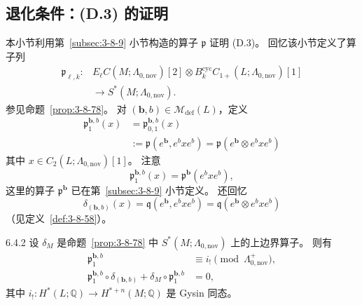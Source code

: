 
\subsection{退化条件：\textup{(D.3)} 的证明}
\label{subsec:6-4-2}

本小节利用第~\ref{subsec:3-8-9} 小节构造的算子
$\mathfrak p$ 证明 \textup{(D.3)}。
回忆该小节定义了算子列
\[
\begin{aligned}
\mathfrak p_{\ell,k}\colon{}&
E_\ell C(M;\Lambda_{0,\mathrm{nov}})[2]
\otimes
B_k^{\mathrm{cyc}}C_{1+}(L;\Lambda_{0,\mathrm{nov}})[1]\\
&\longrightarrow S^*(M;\Lambda_{0,\mathrm{nov}}).
\end{aligned}
\]
参见命题~\ref{prop:3-8-78}。
对 $(\boldsymbol b,b)\in\mathcal M_{\mathrm{def}}(L)$，定义
\begin{equation}
\begin{aligned}
\mathfrak p_1^{\boldsymbol b,b}(x)
&=\mathfrak p_{0,1}^{\boldsymbol b,b}(x)\\
&:=\mathfrak p(e^{\boldsymbol b},e^bxe^b)
=\mathfrak p(e^{\boldsymbol b}\otimes e^bxe^b)
\end{aligned}
\tag{6.4.1}\label{eq:6-4-1}
\end{equation}
其中 $x\in C_2(L;\Lambda_{0,\mathrm{nov}})[1]$。
注意
\[
\mathfrak p_1^{\boldsymbol b,b}(x)
=\mathfrak p^{\boldsymbol b}(e^bxe^b),
\]
这里的算子 $\mathfrak p^{\boldsymbol b}$
已在第~\ref{subsec:3-8-9} 小节定义。
还回忆
\[
\delta_{(\boldsymbol b,b)}(x)
=\mathfrak q(e^{\boldsymbol b},e^bxe^b)
=\mathfrak q(e^{\boldsymbol b}\otimes e^bxe^b)
\]
（见定义~\ref{def:3-8-58}）。

\begin{lemma}{6.4.2}\label{lem:6-4-2}
设 $\delta_M$ 是命题~\ref{prop:3-8-78}
中 $S^*(M;\Lambda_{0,\mathrm{nov}})$ 上的上边界算子。
则有
\begin{align}
\mathfrak p_1^{\boldsymbol b,b}
&\equiv i_!\pmod{\Lambda_{0,\mathrm{nov}}^+},
\tag{6.4.3.1}\label{eq:6-4-3-1}\\
\mathfrak p_1^{\boldsymbol b,b}
\circ\delta_{(\boldsymbol b,b)}
+\delta_M\circ\mathfrak p_1^{\boldsymbol b,b}
&=0,
\tag{6.4.3.2}\label{eq:6-4-3-2}
\end{align}
其中 $i_!:H^*(L;\mathbb Q)\to
H^{*+n}(M;\mathbb Q)$ 是 Gysin 同态。
\end{lemma}

